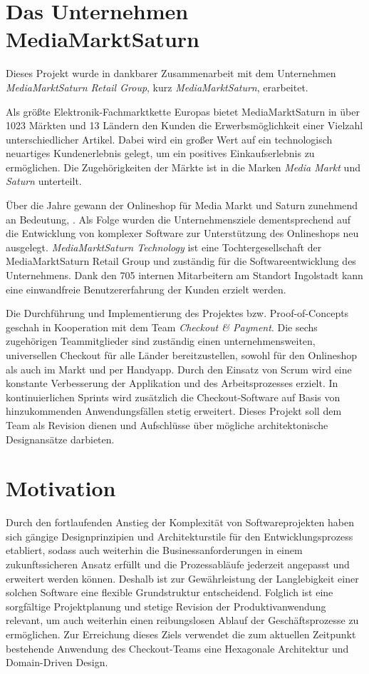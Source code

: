 \section{Das Unternehmen MediaMarktSaturn}

Dieses Projekt wurde in dankbarer Zusammenarbeit mit dem Unternehmen \emph{MediaMarktSaturn Retail Group}, kurz \emph{MediaMarktSaturn}, erarbeitet.

Als größte Elektronik-Fachmarktkette Europas bietet MediaMarktSaturn in über 1023 Märkten und 13 Ländern den Kunden die Erwerbsmöglichkeit einer Vielzahl unterschiedlicher Artikel. Dabei wird ein großer Wert auf ein technologisch neuartiges Kundenerlebnis gelegt, um ein positives Einkaufserlebnis zu ermöglichen. Die Zugehörigkeiten der Märkte ist in die Marken \emph{Media Markt} und \emph{Saturn} unterteilt.

Über die Jahre gewann der Onlineshop für Media Markt und Saturn zunehmend an Bedeutung, . Als Folge wurden die Unternehmensziele dementsprechend auf die Entwicklung von komplexer Software zur Unterstützung des Onlineshops neu ausgelegt. \emph{MediaMarktSaturn Technology} ist eine Tochtergesellschaft der MediaMarktSaturn Retail Group und zuständig für die Softwareentwicklung des Unternehmens. Dank den 705 internen Mitarbeitern am Standort Ingolstadt kann eine einwandfreie Benutzererfahrung der Kunden erzielt werden. 

Die Durchführung und Implementierung des Projektes bzw. Proof-of-Concepts geschah in Kooperation mit dem Team \emph{Checkout \& Payment}. Die sechs zugehörigen Teammitglieder sind zuständig einen unternehmensweiten, universellen Checkout für alle Länder bereitzustellen, sowohl für den Onlineshop als auch im Markt und per Handyapp. Durch den Einsatz von \Gls{Scrum} wird eine konstante Verbesserung der Applikation und des Arbeitsprozesses erzielt. In kontinuierlichen \Glspl{Sprint} wird zusätzlich die Checkout-Software auf Basis von hinzukommenden Anwendungsfällen stetig erweitert. Dieses Projekt soll dem Team als Revision dienen und Aufschlüsse über mögliche architektonische Designansätze darbieten.


\section{Motivation}


Durch den fortlaufenden Anstieg der Komplexität von Softwareprojekten haben sich gängige Designprinzipien und Architekturstile für den Entwicklungsprozess etabliert, sodass auch weiterhin die Businessanforderungen in einem zukunftssicheren Ansatz erfüllt und die Prozessabläufe jederzeit angepasst und erweitert werden können. Deshalb ist zur Gewährleistung der Langlebigkeit einer solchen Software eine flexible Grundstruktur entscheidend. Folglich ist eine sorgfältige Projektplanung und stetige Revision der Produktivanwendung relevant, um auch weiterhin einen reibungslosen Ablauf der Geschäftsprozesse zu ermöglichen. Zur Erreichung dieses Ziels verwendet die zum aktuellen Zeitpunkt bestehende Anwendung des Checkout-Teams eine Hexagonale Architektur und Domain-Driven Design.

